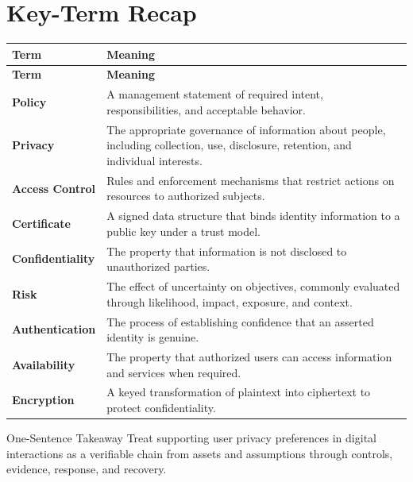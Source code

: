 \documentclass[11pt,letterpaper]{article}
\begin{document}
\section*{Key-Term Recap}
\begin{longtable}{>{\raggedright\arraybackslash}p{}>{\raggedright\arraybackslash}p{}}
\toprule\rowcolor{Navy}\color{white}\textbf{Term} & \color{white}\textbf{Meaning}\\\midrule
\endfirsthead
\toprule\rowcolor{Navy}\color{white}\textbf{Term} & \color{white}\textbf{Meaning}\\\midrule
\endhead
\textbf{Policy} & A management statement of required intent, responsibilities, and acceptable behavior. \\\midrule
\textbf{Privacy} & The appropriate governance of information about people, including collection, use, disclosure, retention, and individual interests. \\\midrule
\textbf{Access Control} & Rules and enforcement mechanisms that restrict actions on resources to authorized subjects. \\\midrule
\textbf{Certificate} & A signed data structure that binds identity information to a public key under a trust model. \\\midrule
\textbf{Confidentiality} & The property that information is not disclosed to unauthorized parties. \\\midrule
\textbf{Risk} & The effect of uncertainty on objectives, commonly evaluated through likelihood, impact, exposure, and context. \\\midrule
\textbf{Authentication} & The process of establishing confidence that an asserted identity is genuine. \\\midrule
\textbf{Availability} & The property that authorized users can access information and services when required. \\\midrule
\textbf{Encryption} & A keyed transformation of plaintext into ciphertext to protect confidentiality. \\\midrule
\bottomrule
\end{longtable}
\begin{CornellExamBox}{One-Sentence Takeaway}
Treat supporting user privacy preferences in digital interactions as a verifiable chain from assets and assumptions through controls, evidence, response, and recovery.
\end{CornellExamBox}
\end{document}
